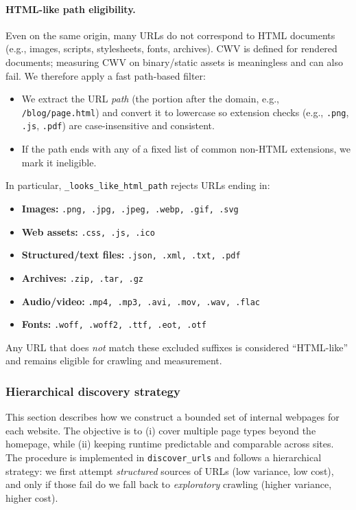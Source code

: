 \paragraph{HTML-like path eligibility.}
Even on the same origin, many URLs do not correspond to HTML documents (e.g., images, scripts, stylesheets, fonts, archives). CWV is defined for rendered documents; measuring CWV on binary/static assets is meaningless and can also fail. We therefore apply a fast path-based filter:
\begin{itemize}
    \item We extract the URL \emph{path} (the portion after the domain, e.g., \texttt{/blog/page.html}) and convert it to lowercase so extension checks (e.g., \texttt{.png}, \texttt{.js}, \texttt{.pdf}) are case-insensitive and consistent.

    \item If the path ends with any of a fixed list of common non-HTML extensions, we mark it ineligible.
\end{itemize}
In particular, \texttt{\_looks\_like\_html\_path} rejects URLs ending in:
\begin{itemize}
    \item \textbf{Images:} \texttt{.png, .jpg, .jpeg, .webp, .gif, .svg}
    \item \textbf{Web assets:} \texttt{.css, .js, .ico}
    \item \textbf{Structured/text files:} \texttt{.json, .xml, .txt, .pdf}
    \item \textbf{Archives:} \texttt{.zip, .tar, .gz}
    \item \textbf{Audio/video:} \texttt{.mp4, .mp3, .avi, .mov, .wav, .flac}
    \item \textbf{Fonts:} \texttt{.woff, .woff2, .ttf, .eot, .otf}
\end{itemize}
Any URL that does \emph{not} match these excluded suffixes is considered ``HTML-like'' and remains eligible for crawling and measurement.


\subsubsection{Hierarchical discovery strategy}
\label{app:hierarchical-discovery}

This section describes how we construct a bounded set of internal webpages for each website. The objective is to (i) cover multiple page types beyond the homepage, while (ii) keeping runtime predictable and comparable across sites. The procedure is implemented in \texttt{discover\_urls} and follows a hierarchical strategy: we first attempt \emph{structured} sources of URLs (low variance, low cost), and only if those fail do we fall back to \emph{exploratory} crawling (higher variance, higher cost).



